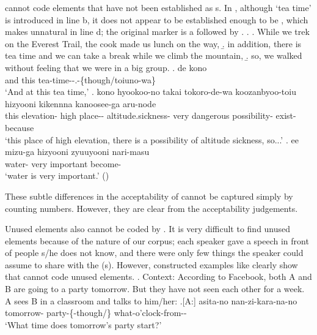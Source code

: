  cannot code elements that have not been established as s.
In \Next,
although `tea time' is introduced in line b,
it does not appear to be established enough to be ,
which makes  unnatural in line d;
the original marker is a  followed by .
%
\ex.\label{thii-taimu}
 \a. While we trek on the Everest Trail, the cook made us lunch on the way,
 \b. in addition, there is tea time and we can take a break while we climb the mountain,
 \b. so, we walked without feeling that we were in a big group.
 \bg. de kono  \\
		and this tea-time--.-\{though/toiuno-wa\} \\
		`And at this tea time,'
 \bg. kono hyookoo-no {takai} {tokoro-de-wa} koozanbyoo-toiu hizyooni {kikennna} {kanoosee-ga} aru-node \\
		this elevation- high place-- altitude.sickness- very dangerous possibility- exist-because \\
		`this place of high elevation, there is a possibility of altitude sickness, so...'
 \bg. ee {mizu-ga} hizyooni zyuuyooni nari-masu \\
		 water- very important become- \\
		`water is very important.'
		 \hfill{()}

These subtle differences in the acceptability of  cannot be captured simply by counting numbers.
However, they are clear from the acceptability judgements.

Unused elements also cannot be coded by .
It is very difficult to find unused elements
because of the nature of our corpus;
each speaker gave a speech in front of people s/he does not know,
and there were only few things the speaker could assume to share with the (s).
However, constructed examples like \Next clearly show that  cannot code unused elements.
%
\ex. \label{FacebookParty}Context: According to Facebook, both A and B are going to a party tomorrow. But they have not seen each other for a week. A sees B in a classroom and talks to him/her:
	\ag.[A:] asita-no  nan-zi-kara-na-no \\
	    	tomorrow- party-\{-though/\} what-o'clock-from-- \\
		`What time does tomorrow's party start?' 

